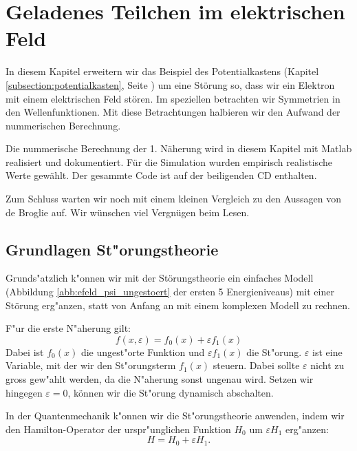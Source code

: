 \chapter{Geladenes Teilchen im elektrischen Feld\label{chapter:efeld}}
\begin{refsection}



In diesem Kapitel erweitern wir das Beispiel des Potentialkastens 
(Kapitel \ref{subsection:potentialkasten}, Seite \pageref{subsection:potentialkasten})
um eine St\"orung so, dass wir ein Elektron mit einem elektrischen Feld st\"oren.
Im speziellen betrachten wir Symmetrien in den Wellenfunktionen.
Mit diese Betrachtungen halbieren wir den Aufwand der nummerischen Berechnung.

Die nummerische Berechnung der 1. N\"aherung wird in diesem Kapitel mit Matlab realisiert und dokumentiert. 
F\"ur die Simulation wurden empirisch realistische Werte gew\"ahlt.
Der gesammte Code ist auf der beiligenden CD enthalten.

Zum Schluss warten wir noch mit einem kleinen Vergleich zu den Aussagen von de Broglie \cite{efeld:de_Broglie} auf.
Wir w\"unschen viel Vergn\"ugen beim Lesen.



\section{Grundlagen St"orungstheorie}
Grunds"atzlich k"onnen wir mit der St\"orungstheorie ein einfaches Modell 
(Abbildung \ref{abb:efeld_psi_ungestoert} der ersten 5 Energieniveaus) 
mit einer St\"orung erg"anzen, statt von Anfang an mit einem komplexen Modell zu rechnen.

F"ur die erste N"aherung gilt:
\[
  f(x, \varepsilon) = f_0(x) + \varepsilon f_1(x)
\]
Dabei ist $f_0(x)$ die ungest"orte Funktion und $\varepsilon f_1(x)$ die St"orung.
$\varepsilon$ ist eine Variable, mit der wir den St"orungsterm $f_1(x)$ steuern.
Dabei sollte $\varepsilon$ nicht zu gross gew"ahlt werden,
da die N"aherung sonst ungenau wird.
Setzen wir hingegen $\varepsilon = 0$, k\"onnen wir die St"orung dynamisch abschalten.




In der Quantenmechanik k"onnen wir die St"orungstheorie anwenden,
indem wir den Hamilton-Operator der urspr"unglichen Funktion $H_0$
um $\varepsilon H_1$ erg"anzen:
\[
  H = H_0 + \varepsilon H_1.
\]


\end{refsection}
